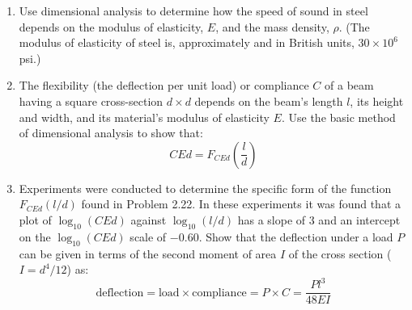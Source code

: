 \begin{enumerate}
    \item[\textbf{Problem 2.21.}] Use dimensional analysis to determine how the speed of sound in steel depends on the modulus of elasticity, $E$, and the mass density, $\rho$. (The modulus of elasticity of steel is, approximately and in British units, $30 \times 10^6$ psi.)

    \item[\textbf{Problem 2.22.}] The flexibility (the deflection per unit load) or compliance $C$ of a beam having a square cross-section $d \times d$ depends on the beam's length $l$, its height and width, and its material's modulus of elasticity $E$. Use the basic method of dimensional analysis to show that:
    \begin{equation}
        CEd = F_{CEd}\left(\frac{l}{d}\right)
    \end{equation}

    \item[\textbf{Problem 2.23.}] Experiments were conducted to determine the specific form of the function $F_{CEd}(l/d)$ found in Problem 2.22. In these experiments it was found that a plot of $\log_{10} (CEd)$ against $\log_{10} (l / d)$ has a slope of 3 and an intercept on the $\log_{10} (CEd)$ scale of $-0.60$. Show that the deflection under a load $P$ can be given in terms of the second moment of area $I$ of the cross section ($I = d^4/12$) as:
    \begin{equation}
        \text{deflection} = \text{load} \times \text{compliance} = P \times C = \frac{Pl^3}{48EI}
    \end{equation}

\end{enumerate}